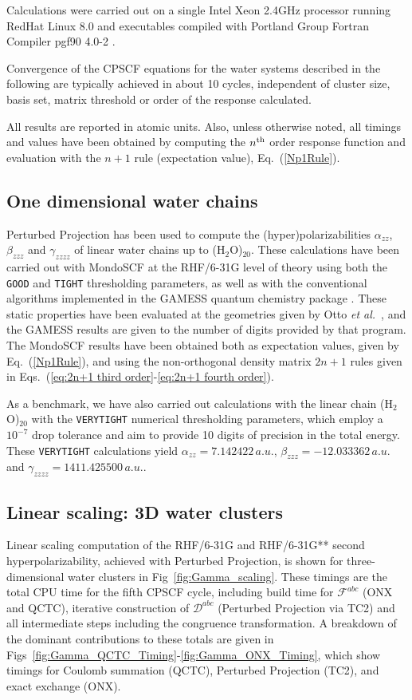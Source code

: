 \documentclass[prl,aps,preprint,showpacs,superbib]{revtex4}
\def\F{\mathcal{F}}
\def\D{\mathcal{D}}
\begin{document}
Calculations were carried out on a single Intel Xeon 2.4GHz processor running RedHat Linux 8.0 and  
executables compiled with Portland Group Fortran Compiler pgf90 4.0-2 \cite{PGF90}.

Convergence of the CPSCF equations for the water systems described in the following 
are typically achieved in about 10 cycles, independent of cluster size, basis set,
matrix threshold or order of the response calculated.

All results are reported in atomic units.  Also, unless otherwise noted, all timings and values 
have been obtained by computing the $n^{\rm th}$ order response function and evaluation with the
$n+1$ rule (expectation value), Eq.~(\ref{Np1Rule}).
\subsection{One dimensional water chains}

Perturbed Projection has been used to compute the (hyper)polarizabilities $\alpha_{zz}$, 
$\beta_{zzz}$ and $\gamma_{zzzz}$ of linear water chains up to (H$_2$O)$_{20}$. 
These calculations have been carried out with {\sc MondoSCF} at the RHF/6-31G level of theory using 
both the {\tt GOOD} and {\tt TIGHT} thresholding parameters,  as well as with the conventional algorithms implemented
in the {\sc GAMESS} quantum chemistry package \cite{gamess}.  These static properties have 
been evaluated at the geometries given by Otto {\em et al.}~\cite{POtto99}, and the GAMESS
results are given to the number of digits provided by that program.
The {\sc MondoSCF} results have been obtained both as expectation values, given by Eq.~(\ref{Np1Rule}), 
and using the non-orthogonal density matrix $2 n+1$ rules given in 
Eqs.~(\ref{eq:2n+1 third order}-\ref{eq:2n+1 fourth order}).

As a benchmark, we have also carried out calculations with the linear chain (H$_2$O)$_{20}$ with 
the {\tt VERYTIGHT} numerical thresholding parameters, which employ a $10^{-7}$ drop tolerance and
aim to provide 10 digits of precision in the total energy.   These {\tt VERYTIGHT} calculations yield  
$\alpha_{zz}=7.142422\,a.u.$, $\beta_{zzz}=-12.033362\,a.u.$ and $\gamma_{zzzz}=1411.425500\,a.u.$. 

\subsection{Linear scaling: 3D water clusters}

Linear scaling computation of the RHF/6-31G and RHF/6-31G** second hyperpolarizability,
achieved with Perturbed Projection, is shown for three-dimensional water clusters 
in Fig~\ref{fig:Gamma_scaling}.  These timings are the total CPU time for the fifth CPSCF cycle, 
including build time for $\F^{abc}$ ({\sc ONX} and {\sc QCTC}), 
iterative construction of $\D^{abc}$ (Perturbed Projection via {\sc TC2}) and all intermediate
steps including the congruence transformation.
A breakdown of the dominant contributions to these totals are given
in Figs~\ref{fig:Gamma_QCTC_Timing}-\ref{fig:Gamma_ONX_Timing}, which show timings for Coulomb 
summation ({\sc QCTC}), Perturbed Projection ({\sc TC2}), and exact exchange ({\sc ONX}).
\end{document}
